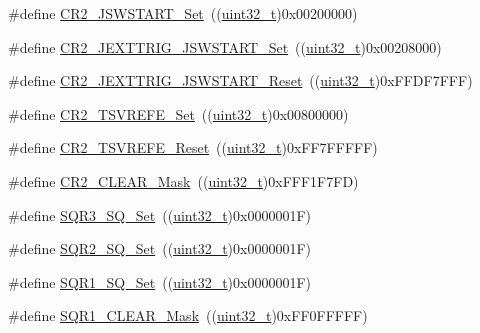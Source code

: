 \begin{DoxyCompactItemize}
\#define \hyperlink{group___a_d_c___private___defines_ga5292617782f3327f2e1ed0bd9461704e}{C\+R2\+\_\+\+J\+S\+W\+S\+T\+A\+R\+T\+\_\+\+Set}~((\hyperlink{_p_e___types_8h_a33594304e786b158f3fb30289278f5af}{uint32\+\_\+t})0x00200000)
\item 
\#define \hyperlink{group___a_d_c___private___defines_gaac5989ccf10d806f2f6a70f925d6b130}{C\+R2\+\_\+\+J\+E\+X\+T\+T\+R\+I\+G\+\_\+\+J\+S\+W\+S\+T\+A\+R\+T\+\_\+\+Set}~((\hyperlink{_p_e___types_8h_a33594304e786b158f3fb30289278f5af}{uint32\+\_\+t})0x00208000)
\item 
\#define \hyperlink{group___a_d_c___private___defines_gaaa2fb01c1649fde61115602559942ee2}{C\+R2\+\_\+\+J\+E\+X\+T\+T\+R\+I\+G\+\_\+\+J\+S\+W\+S\+T\+A\+R\+T\+\_\+\+Reset}~((\hyperlink{_p_e___types_8h_a33594304e786b158f3fb30289278f5af}{uint32\+\_\+t})0x\+F\+F\+D\+F7\+F\+F\+F)
\item 
\#define \hyperlink{group___a_d_c___private___defines_ga7f5e0f807edebbfcef4883f3ec42b9e8}{C\+R2\+\_\+\+T\+S\+V\+R\+E\+F\+E\+\_\+\+Set}~((\hyperlink{_p_e___types_8h_a33594304e786b158f3fb30289278f5af}{uint32\+\_\+t})0x00800000)
\item 
\#define \hyperlink{group___a_d_c___private___defines_gaa207bc0eeed8b546dc9536b02df633b5}{C\+R2\+\_\+\+T\+S\+V\+R\+E\+F\+E\+\_\+\+Reset}~((\hyperlink{_p_e___types_8h_a33594304e786b158f3fb30289278f5af}{uint32\+\_\+t})0x\+F\+F7\+F\+F\+F\+F\+F)
\item 
\#define \hyperlink{group___a_d_c___private___defines_ga49192361afb92aee0e3f1124ef1131a0}{C\+R2\+\_\+\+C\+L\+E\+A\+R\+\_\+\+Mask}~((\hyperlink{_p_e___types_8h_a33594304e786b158f3fb30289278f5af}{uint32\+\_\+t})0x\+F\+F\+F1\+F7\+F\+D)
\item 
\#define \hyperlink{group___a_d_c___private___defines_ga8a04f115021dc5261562b4dc04c01109}{S\+Q\+R3\+\_\+\+S\+Q\+\_\+\+Set}~((\hyperlink{_p_e___types_8h_a33594304e786b158f3fb30289278f5af}{uint32\+\_\+t})0x0000001\+F)
\item 
\#define \hyperlink{group___a_d_c___private___defines_ga2329f779aee00e5990d6430a01de8cb0}{S\+Q\+R2\+\_\+\+S\+Q\+\_\+\+Set}~((\hyperlink{_p_e___types_8h_a33594304e786b158f3fb30289278f5af}{uint32\+\_\+t})0x0000001\+F)
\item 
\#define \hyperlink{group___a_d_c___private___defines_ga91fb5f63b765a543dfa419ea0219351b}{S\+Q\+R1\+\_\+\+S\+Q\+\_\+\+Set}~((\hyperlink{_p_e___types_8h_a33594304e786b158f3fb30289278f5af}{uint32\+\_\+t})0x0000001\+F)
\item 
\#define \hyperlink{group___a_d_c___private___defines_ga6e3e238f38d7ff17939cbd5417fc51cc}{S\+Q\+R1\+\_\+\+C\+L\+E\+A\+R\+\_\+\+Mask}~((\hyperlink{_p_e___types_8h_a33594304e786b158f3fb30289278f5af}{uint32\+\_\+t})0x\+F\+F0\+F\+F\+F\+F\+F)

\end{DoxyCompactItemize}

